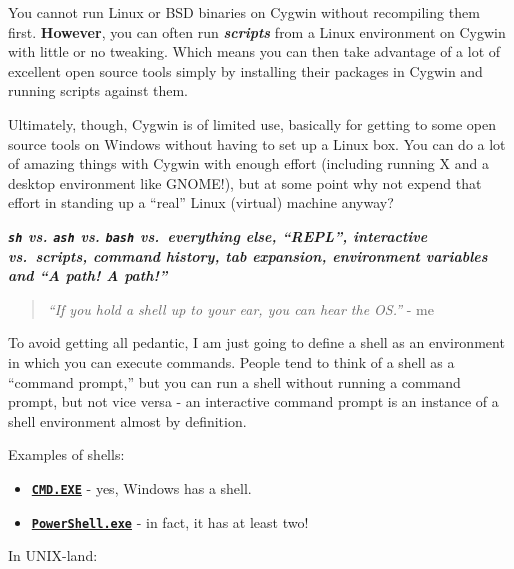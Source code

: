\documentclass[10pt,]{book}
\numberwithin{figure}{chapter}
\begin{document}
You cannot run Linux or BSD binaries on Cygwin without recompiling them
first. \textbf{However}, you can often run \textbf{\emph{scripts}} from
a Linux environment on Cygwin with little or no tweaking. Which means
you can then take advantage of a lot of excellent open source tools
simply by installing their packages in Cygwin and running scripts
against them.

Ultimately, though, Cygwin is of limited use, basically for getting to
some open source tools on Windows without having to set up a Linux box.
You can do a lot of amazing things with Cygwin with enough effort
(including running X and a desktop environment like GNOME!), but at some
point why not expend that effort in standing up a ``real'' Linux
(virtual) machine anyway?


\textbf{\emph{\texttt{sh} vs. \texttt{ash} vs. \texttt{bash}
vs.~everything else, ``REPL'', interactive vs.~scripts, command history,
tab expansion, environment variables and ``A path! A path!''}}

\begin{quote}
\emph{``If you hold a shell up to your ear, you can hear the OS.''} - me
\end{quote}

To avoid getting all pedantic, I am just going to define a shell as an
environment in which you can execute commands. People tend to think of a
shell as a ``command prompt,'' but you can run a shell without running a
command prompt, but not vice versa - an interactive command prompt is an
instance of a shell environment almost by definition.

Examples of shells:

\begin{itemize}
\item
  \href{https://technet.microsoft.com/en-us/library/cc754340.aspx}{\textbf{\texttt{CMD.EXE}}}
  - yes, Windows has a shell.
\item
  \href{https://technet.microsoft.com/en-us/library/ms714469\%28v=VS.85\%29.aspx}{\textbf{\texttt{PowerShell.exe}}}
  - in fact, it has at least two!
\end{itemize}

In UNIX-land:
\end{document}
